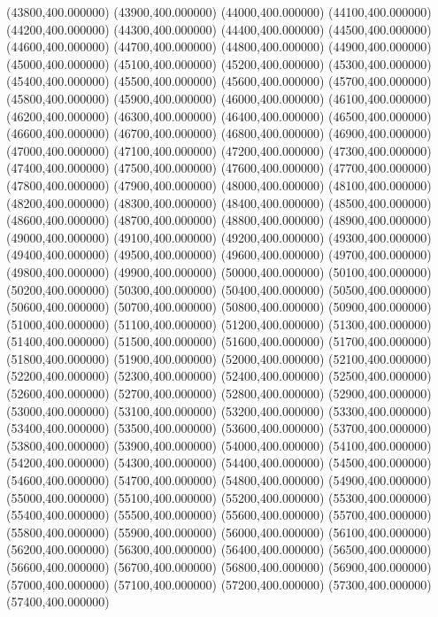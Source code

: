 (43800,400.000000)
(43900,400.000000)
(44000,400.000000)
(44100,400.000000)
(44200,400.000000)
(44300,400.000000)
(44400,400.000000)
(44500,400.000000)
(44600,400.000000)
(44700,400.000000)
(44800,400.000000)
(44900,400.000000)
(45000,400.000000)
(45100,400.000000)
(45200,400.000000)
(45300,400.000000)
(45400,400.000000)
(45500,400.000000)
(45600,400.000000)
(45700,400.000000)
(45800,400.000000)
(45900,400.000000)
(46000,400.000000)
(46100,400.000000)
(46200,400.000000)
(46300,400.000000)
(46400,400.000000)
(46500,400.000000)
(46600,400.000000)
(46700,400.000000)
(46800,400.000000)
(46900,400.000000)
(47000,400.000000)
(47100,400.000000)
(47200,400.000000)
(47300,400.000000)
(47400,400.000000)
(47500,400.000000)
(47600,400.000000)
(47700,400.000000)
(47800,400.000000)
(47900,400.000000)
(48000,400.000000)
(48100,400.000000)
(48200,400.000000)
(48300,400.000000)
(48400,400.000000)
(48500,400.000000)
(48600,400.000000)
(48700,400.000000)
(48800,400.000000)
(48900,400.000000)
(49000,400.000000)
(49100,400.000000)
(49200,400.000000)
(49300,400.000000)
(49400,400.000000)
(49500,400.000000)
(49600,400.000000)
(49700,400.000000)
(49800,400.000000)
(49900,400.000000)
(50000,400.000000)
(50100,400.000000)
(50200,400.000000)
(50300,400.000000)
(50400,400.000000)
(50500,400.000000)
(50600,400.000000)
(50700,400.000000)
(50800,400.000000)
(50900,400.000000)
(51000,400.000000)
(51100,400.000000)
(51200,400.000000)
(51300,400.000000)
(51400,400.000000)
(51500,400.000000)
(51600,400.000000)
(51700,400.000000)
(51800,400.000000)
(51900,400.000000)
(52000,400.000000)
(52100,400.000000)
(52200,400.000000)
(52300,400.000000)
(52400,400.000000)
(52500,400.000000)
(52600,400.000000)
(52700,400.000000)
(52800,400.000000)
(52900,400.000000)
(53000,400.000000)
(53100,400.000000)
(53200,400.000000)
(53300,400.000000)
(53400,400.000000)
(53500,400.000000)
(53600,400.000000)
(53700,400.000000)
(53800,400.000000)
(53900,400.000000)
(54000,400.000000)
(54100,400.000000)
(54200,400.000000)
(54300,400.000000)
(54400,400.000000)
(54500,400.000000)
(54600,400.000000)
(54700,400.000000)
(54800,400.000000)
(54900,400.000000)
(55000,400.000000)
(55100,400.000000)
(55200,400.000000)
(55300,400.000000)
(55400,400.000000)
(55500,400.000000)
(55600,400.000000)
(55700,400.000000)
(55800,400.000000)
(55900,400.000000)
(56000,400.000000)
(56100,400.000000)
(56200,400.000000)
(56300,400.000000)
(56400,400.000000)
(56500,400.000000)
(56600,400.000000)
(56700,400.000000)
(56800,400.000000)
(56900,400.000000)
(57000,400.000000)
(57100,400.000000)
(57200,400.000000)
(57300,400.000000)
(57400,400.000000)
